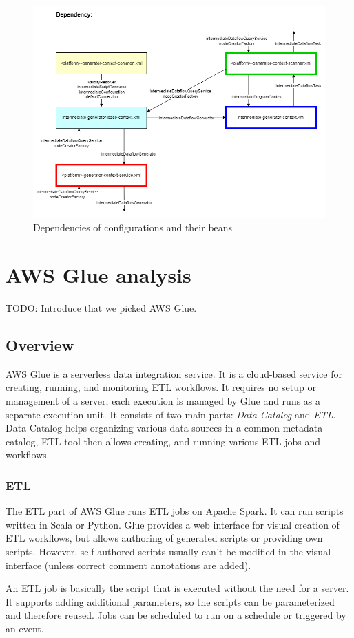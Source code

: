 \begin{figure}[ht]\centering
\includegraphics[width=1.0\textwidth]{img/Intermediate Dataflow Generator Configuration-code service-aware dependency.png}
\caption{Dependencies of configurations and their beans}
\label{fig01:ECSbasedesign02}
\end{figure}  

\section{AWS Glue analysis}

TODO: Introduce that we picked AWS Glue.

\subsection{Overview}

AWS Glue is a serverless data integration service. It is a cloud-based service for creating, running, and monitoring ETL workflows. It requires no setup or management of a server, each execution is managed by Glue and runs as a separate execution unit. It consists of two main parts: \textit{Data Catalog} and \textit{ETL}. Data Catalog helps organizing various data sources in a common metadata catalog, ETL tool then allows creating, and running various ETL jobs and workflows.

\subsubsection{ETL}
The ETL part of AWS Glue runs ETL jobs on Apache Spark. It can run scripts written in Scala or Python. Glue provides a web interface for visual creation of ETL workflows, but allows authoring of generated scripts or providing own scripts. However, self-authored scripts usually can't be modified in the visual interface (unless correct comment annotations are added). 
\par
An ETL job is basically the script that is executed without the need for a server. It supports adding additional parameters, so the scripts can be parameterized and therefore reused. Jobs can be scheduled to run on a schedule or triggered by an event.

